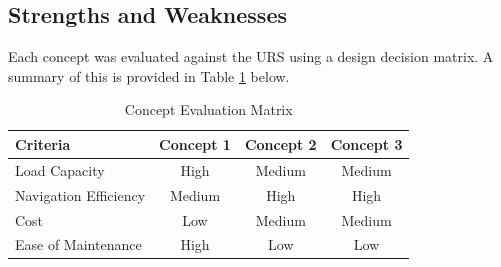 \documentclass[12pt]{article}
\begin{document}
\subsection{Strengths and Weaknesses}
Each concept was evaluated against the URS using a design decision matrix. A summary of this is provided in Table \ref{tab:concept_evaluation} below.


\begin{table}[h!]
\centering
\caption{Concept Evaluation Matrix}
\begin{tabular}{@{}lccc@{}}
\toprule
\textbf{Criteria}      & \textbf{Concept 1} & \textbf{Concept 2} &\textbf{Concept 3} \\ \midrule
Load Capacity          & High               & Medium              & Medium            \\
Navigation Efficiency  & Medium             & High                & High              \\
Cost                   & Low                & Medium              & Medium            \\
Ease of Maintenance    & High               & Low                 & Low               \\ \bottomrule
\end{tabular}
\label{tab:concept_evaluation}
\end{table}
\FloatBarrier

 
\end{document}

